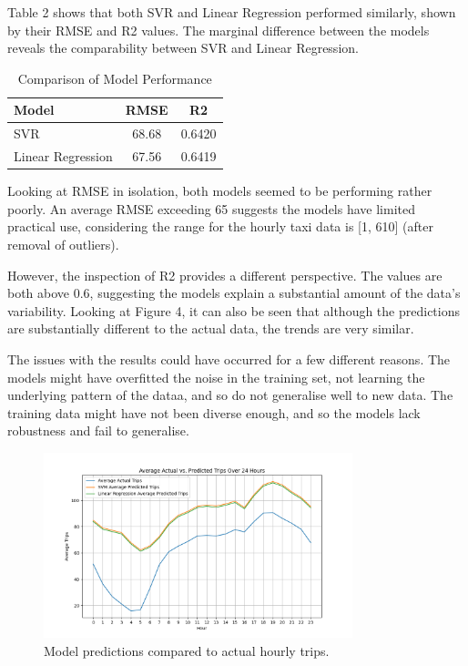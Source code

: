 \documentclass[11pt]{article}
\begin{document}
Table 2 shows that both SVR and Linear Regression performed similarly, shown by their RMSE and R2 values. The marginal difference between the models reveals the comparability between SVR and Linear Regression. 

\begin{table}[htbp]
    \centering
    \begin{tabular}{lcc}
        \hline
        Model & RMSE & R2 \\
        \hline
        SVR & 68.68 & 0.6420 \\
        Linear Regression & 67.56 & 0.6419 \\
        \hline
    \end{tabular}
    \caption{Comparison of Model Performance}
    \label{tab:model_comparison}
\end{table}

Looking at RMSE in isolation, both models seemed to be performing rather poorly. An average RMSE exceeding 65 suggests the models have limited practical use, considering the range for the hourly taxi data is [1, 610] (after removal of outliers). 

However, the inspection of R2 provides a different perspective. The values are both above 0.6, suggesting the models explain a substantial amount of the data’s variability. Looking at Figure 4, it can also be seen that although the predictions are substantially different to the actual data, the trends are very similar.

The issues with the results could have occurred for a few different reasons. The models might have overfitted the noise in the training set, not learning the underlying pattern of the dataa, and so do not generalise well to new data. The training data might have not been diverse enough, and so the models lack robustness and fail to generalise.

\begin{figure}[htbp]
    \centering
    \includegraphics[width=0.8\textwidth]{Model_Results_plot.png}
    \caption{Model predictions compared to actual hourly trips.}
    \label{fig:taxi}
\end{figure}
\end{document}

